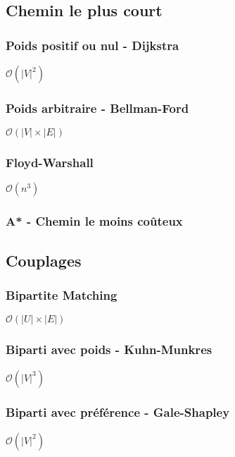 \documentclass[8pt]{article}
\begin{document}
        \subsection{Chemin le plus court}
            \subsubsection{Poids positif ou nul - Dijkstra}
            $\mathcal{O}(\lvert V \rvert^2)$
            {\scriptsize}
            \subsubsection{Poids arbitraire - Bellman-Ford}
            $\mathcal{O}(\lvert V \rvert  \times \lvert E \rvert)$
            {\scriptsize}
            \subsubsection{Floyd-Warshall}
            $\mathcal{O}(n^3)$
            {\scriptsize}
            \subsubsection{A* - Chemin le moins coûteux}
            {\scriptsize}
        \subsection{Couplages}
            \subsubsection{Bipartite Matching}
            $\mathcal{O}(\lvert U \rvert  \times \lvert E \rvert)$
            {\scriptsize}
            \subsubsection{Biparti avec poids - Kuhn-Munkres}
            $\mathcal{O}(\lvert V \rvert ^3)$
            {\scriptsize}
            \subsubsection{Biparti avec préférence - Gale-Shapley}
            $\mathcal{O}(\lvert V \rvert ^2)$
            {\scriptsize}
\end{document}
